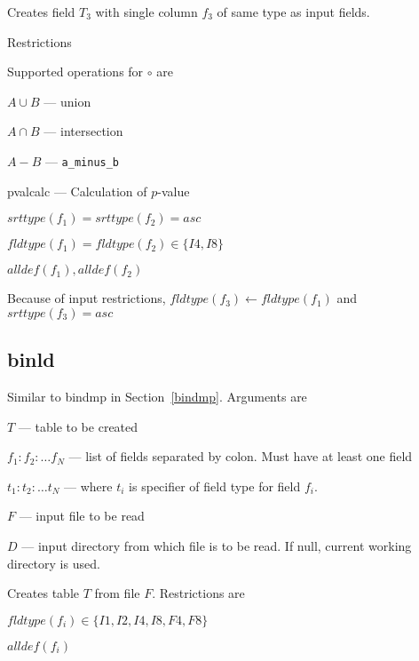 \documentclass{report}
\begin{document}
Creates field \(T_3\) with single column \(f_3\) of same type as input
fields. 

Restrictions
\be
\item Supported operations for \(\circ\) are 
\be
\item \(A \cup B\) --- union
\item \(A \cap B\) --- intersection
\item \(A - B\) --- \verb+a_minus_b+
\item pvalcalc --- Calculation of \(p\)-value
\ee
\item \(srttype(f_1) = srttype(f_2) = asc\) 
\item \(fldtype(f_1) = fldtype(f_2)  \in \{I4, I8\}\)
\item \(alldef(f_1),  alldef(f_2)\)
\item Because of input restrictions, 
  \(fldtype(f_3) \leftarrow fldtype(f_1)\) and \(srttype(f_3) = asc\)
\ee


\subsection{binld}
\label{binld}
Similar to bindmp in Section~\ref{bindmp}.
Arguments are
\be
\item \(T\) --- table to be created
\item \(f_1:f_2:\ldots f_N\) --- list of fields separated by colon. Must
have at least one field
\item \(t_1:t_2:\ldots t_N\) --- where \(t_i\) is specifier of field
type for field \(f_i\). 
\item \(F\) --- input file to be read
\item \(D\) --- input directory from which file is to be read. If
null, current working directory is used. 
\ee

Creates table \(T\) from file \(F\). Restrictions are 
\be
\item \(fldtype(f_i) \in \{I1, I2, I4, I8, F4, F8\}\)
\item \(alldef(f_i)\)
\ee
\end{document}
